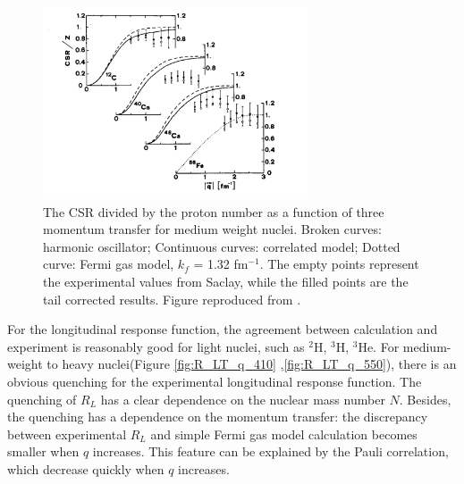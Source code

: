 \begin{figure}[h]
\centering
\includegraphics[width=0.7\textwidth]{figs/csr_data_2.png}
\caption[csr data2]{The CSR divided by the proton number as a function of three momentum transfer
for medium weight nuclei. Broken curves: harmonic oscillator; Continuous curves: correlated
model; Dotted curve: Fermi gas model, $k_f$ = 1.32 fm$^{-1}$. The empty points represent the
experimental values from Saclay, while the filled points are the tail corrected results.
 Figure reproduced from \cite{Orlandini1991}.
\label{fig:csr_data2}}
\end{figure}

For the longitudinal response function, the agreement between calculation and experiment is reasonably good
for light nuclei, such as $^2$H, $^3$H, $^3$He. For medium-weight to heavy nuclei(Figure \ref{fig:R_LT_q_410}
,\ref{fig:R_LT_q_550}),
there is an obvious
quenching for the experimental longitudinal response function. The quenching of $R_L$ has a clear
dependence on the nuclear mass number $N$. Besides, the quenching has a dependence on the momentum transfer:
the discrepancy between experimental $R_L$ and simple Fermi gas model calculation becomes smaller when $q$
increases. This feature can be explained by the Pauli correlation, which decrease quickly when $q$ increases.


